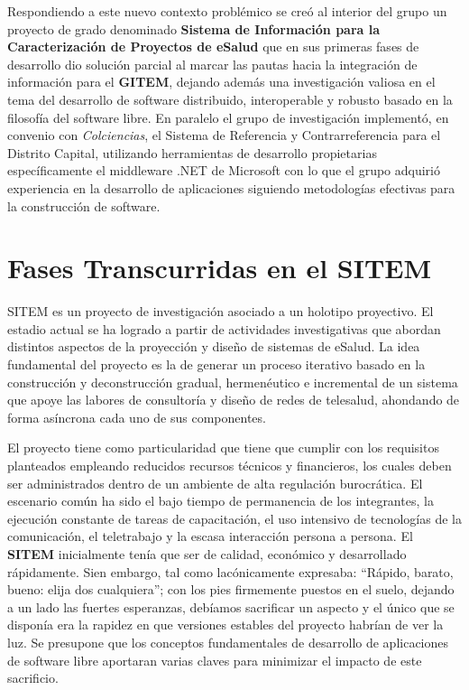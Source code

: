 Respondiendo a este nuevo contexto problémico se creó al interior del grupo un proyecto de grado denominado \textbf{Sistema de Información para la Caracterización de Proyectos de eSalud} que en sus primeras fases de desarrollo dio solución parcial al marcar las pautas hacia la integración de información para el \textbf{GITEM}, dejando además una investigación valiosa en el tema del desarrollo de software distribuido, interoperable y robusto basado en la filosofía del software libre. En paralelo el grupo de investigación implementó, en convenio con \textit{Colciencias}, el Sistema de Referencia y Contrarreferencia para el Distrito Capital, utilizando herramientas de desarrollo propietarias específicamente el middleware .NET de Microsoft con lo que el grupo adquirió experiencia en la desarrollo de aplicaciones siguiendo metodologías efectivas para la construcción de software.

\section{Fases Transcurridas en el SITEM}
SITEM es un proyecto de investigación asociado a un holotipo proyectivo\cite{hurtado2000}. El estadio actual se ha logrado a partir de actividades investigativas que abordan distintos aspectos de la proyección y diseño de sistemas de eSalud. La idea fundamental del proyecto es la de generar un proceso iterativo basado en la construcción y deconstrucción gradual, hermenéutico e incremental de un sistema que apoye las labores de consultoría y diseño de redes de telesalud, ahondando de forma asíncrona cada uno de sus componentes. 

El proyecto tiene como particularidad que tiene que cumplir con los requisitos planteados empleando reducidos recursos técnicos y financieros, los cuales deben ser administrados dentro de un ambiente de alta regulación burocrática. El escenario común ha sido el bajo tiempo de permanencia de los integrantes, la ejecución constante de tareas de capacitación, el uso intensivo de tecnologías de la comunicación, el teletrabajo  y la escasa interacción persona a persona. El \textbf{SITEM} inicialmente tenía que ser de calidad, económico y desarrollado rápidamente. Sien embargo, tal como lacónicamente \cite{larman2003} expresaba: “Rápido, barato, bueno: elija dos cualquiera”; con los pies firmemente puestos en el suelo,  dejando a un lado las fuertes esperanzas, debíamos sacrificar un aspecto y el único que se disponía era la rapidez en que versiones estables del proyecto habrían de ver la luz. Se presupone que  los conceptos fundamentales de desarrollo de aplicaciones de software libre aportaran varias claves para minimizar el impacto de este sacrificio.

